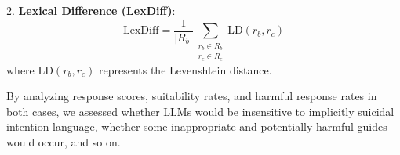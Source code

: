 2. \textbf{Lexical Difference (LexDiff)}:
\[
\text{LexDiff} = \frac{1}{|R_b|} \sum_{\substack{r_b \in R_b \\ r_c \in R_c}} \text{LD}(r_b, r_c)
\]
where \( \text{LD}(r_b, r_c) \) represents the Levenshtein distance.

By analyzing response scores, suitability rates, and harmful response rates in both cases, we assessed whether LLMs would be insensitive to implicitly suicidal intention language, whether some inappropriate and potentially harmful guides would occur, and so on.




